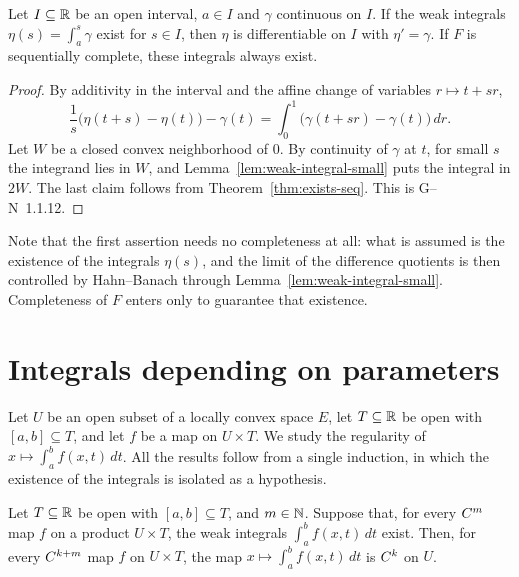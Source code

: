\begin{theorem}
  \label{thm:ftc2}
  \leanok
  Let $I \subseteq \mathbb{R}$ be an open interval, $a \in I$ and $\gamma$ continuous on $I$. If the weak
  integrals $\eta(s) = \int_a^s \gamma$ exist for $s \in I$, then $\eta$ is differentiable on
  $I$ with $\eta' = \gamma$. If $F$ is sequentially complete, these integrals always exist.
\end{theorem}

\begin{proof}
  \leanok
  By additivity in the interval and the affine change of variables $r \mapsto t + sr$,
  \[
    \frac{1}{s}\bigl(\eta(t + s) - \eta(t)\bigr) - \gamma(t)
      = \int_0^1 \bigl(\gamma(t + sr) - \gamma(t)\bigr)\, dr .
  \]
  Let $W$ be a closed convex neighborhood of $0$. By continuity of $\gamma$ at $t$, for small
  $s$ the integrand lies in $W$, and Lemma~\ref{lem:weak-integral-small} puts the integral in
  $2W$. The last claim follows from Theorem~\ref{thm:exists-seq}. This is G--N~1.1.12.
\end{proof}

\begin{remark}
  Note that the first assertion needs no completeness at all: what is assumed is the existence
  of the integrals $\eta(s)$, and the limit of the difference quotients is then controlled by
  Hahn--Banach through Lemma~\ref{lem:weak-integral-small}. Completeness of $F$ enters only to
  guarantee that existence.
\end{remark}

\section{Integrals depending on parameters}
\label{sec:param}

Let $U$ be an open subset of a locally convex space $E$, let $T \subseteq \mathbb{R}$ be open with
$[a, b] \subseteq T$, and let $f$ be a map on $U \times T$. We study the regularity of
$x \mapsto \int_a^b f(x, t)\, dt$. All the results follow from a single induction, in which the
existence of the integrals is isolated as a hypothesis.

\begin{theorem}
  \label{thm:param-induction}
  \leanok
  Let $T \subseteq \mathbb{R}$ be open with $[a, b] \subseteq T$, and $m \in \mathbb{N}$. Suppose that, for
  every $C^{m}$ map $f$ on a product $U \times T$, the weak integrals $\int_a^b f(x, t)\, dt$
  exist. Then, for every $C^{k + m}$ map $f$ on $U \times T$, the map
  $x \mapsto \int_a^b f(x, t)\, dt$ is $C^{k}$ on $U$.
\end{theorem}

